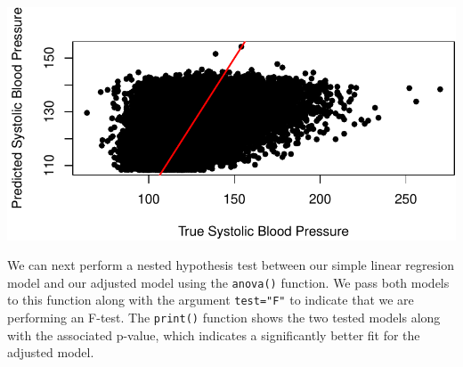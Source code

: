 \documentclass[
  letterpaper,
]{latex/krantz}
\makeatletter
\newenvironment{Shaded}{\begin{snugshade}}{\end{snugshade}}
\newcommand{\AttributeTok}[1]{\textcolor[rgb]{0.40,0.45,0.13}{#1}}
\newcommand{\DecValTok}[1]{\textcolor[rgb]{0.68,0.00,0.00}{#1}}
\newcommand{\FunctionTok}[1]{\textcolor[rgb]{0.28,0.35,0.67}{#1}}
\newcommand{\NormalTok}[1]{\textcolor[rgb]{0.00,0.23,0.31}{#1}}
\newcommand{\SpecialCharTok}[1]{\textcolor[rgb]{0.37,0.37,0.37}{#1}}
\newcommand{\StringTok}[1]{\textcolor[rgb]{0.13,0.47,0.30}{#1}}
\newenvironment{kframe}{%
\medskip{}
\setlength{\fboxsep}{.8em}
 \def\at@end@of@kframe{}%
 \ifinner\ifhmode%
  \def\at@end@of@kframe{\end{minipage}}%
  \begin{minipage}{\columnwidth}%
 \fi\fi%
 \def\FrameCommand##1{\hskip\@totalleftmargin \hskip-\fboxsep
 \colorbox{shadecolor}{##1}\hskip-\fboxsep
     \hskip-\linewidth \hskip-\@totalleftmargin \hskip\columnwidth}%
 \MakeFramed {\advance\hsize-\width
   \@totalleftmargin\z@ \linewidth\hsize
   \@setminipage}}%
 {\par\unskip\endMakeFramed%
 \at@end@of@kframe}
\renewenvironment{Shaded}{\begin{kframe}}{\end{kframe}}
\makeatother
\begin{document}
\begin{Shaded}
\end{Shaded}

\begin{center}
\includegraphics[width=1\textwidth,height=\textheight]{book/linear_regression_files/figure-pdf/unnamed-chunk-12-1.pdf}
\end{center}

We can next perform a nested hypothesis test between our simple linear
regresion model and our adjusted model using the
\texttt{anova()} function.
We pass both models to this function along with the argument
\texttt{test="F"} to indicate that we are performing an F-test. The
\texttt{print()} function
shows the two tested models along with the associated p-value, which
indicates a significantly better fit for the adjusted model.
\end{document}
